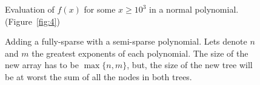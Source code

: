 \documentclass[journal,article,submit,moreauthors,algorithms]{Definitions/mdpi}
\begin{document}
\begin{figure}[H] 
\centering
{}
\hfil
{}
\caption{Evaluation of $f(x)$ for some $ x \geq 10^3$ in a normal polynomial.(Figure~\ref{fig:4})}
\label{fig:10}
\end{figure}



\begin{figure}[H] 
\centering
{}
\hfil
{}
\caption{Adding a fully-sparse with a semi-sparse polynomial. Lets denote $n$ and $m$ the greatest exponents of each polynomial. The size of the new array has to be $\max \{n, m\}$, but, the size of the new tree will be at worst the sum of all the nodes in both trees.}
\label{fig:11}
\end{figure}
\end{document}
